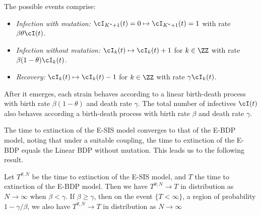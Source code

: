 \documentclass[smallextended]{svjour3}       %
\begin{document}
The possible events comprise:
\begin{itemize}
	\item \emph{Infection with mutation:} $\cI_{K^* + 1}(t)=0 \mapsto \cI_{K^* + 1}(t)=1$
	with rate $\beta \theta \cI(t)$.
	\item \emph{Infection without mutation:} $\cI_k(t) \mapsto \cI_k(t) + 1$
	for $k \in \ZZ$ with rate  \mbox{$\beta(1-\theta)\cI_k(t)$}.	
	\item \emph{Recovery:}  $\cI_k(t) \mapsto \cI_k(t) - 1$
	for $k \in \ZZ$ with rate $\gamma \cI_k(t)$.
	
\end{itemize}

After it emerges, each strain behaves according to a linear birth-death process with birth rate $\beta(1-\theta)$ and death rate $\gamma$. The total number of infectives $\cI(t)$ also behaves according a birth-death process with birth rate $\beta$ and death rate $\gamma$.

The time to extinction of the E-SIS model converges to that of the E-BDP model, noting that under a suitable coupling, the time to extinction of the E-BDP equals the Linear BDP without mutation. This leads us to the following result.
\begin{mythm}
	Let $T^{\theta,N}$ be the time to extinction of the E-SIS model, and $T$ the time to extinction of the E-BDP model. Then we have $T^{\theta,N} \rightarrow T$ in distribution as $N \rightarrow \infty$ when $\beta < \gamma$. If $\beta \geq \gamma$, then on the event $\{T < \infty\}$, a region of probability $1 - \gamma/\beta$, we also have $T^{\theta,N} \rightarrow T$ in distribution as $N \rightarrow \infty$
\end{mythm}
\end{document}

